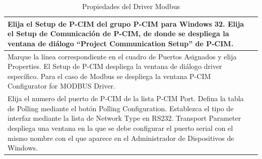 \begin{table}[H]
\centering
\renewcommand*{\arraystretch}{0.01}
\begin{tabular}{*{2}{m{}}}
\hline
  Elija el Setup de P-CIM del grupo P-CIM para Windows 32.
  Elija el Setup de Comunicación de P-CIM, de donde se despliega la ventana 
  de diálogo “Project Communication Setup” de P-CIM.
  &\begin{center}
    \rule{0.4\textwidth}{0.3\textwidth}
  \end{center}\\
\hline
  Marque la línea correspondiente en el cuadro de Puertos Asignados y elija 
  Properties. El Setup de P-CIM despliega la ventana de diálogo driver 
  específico. Para el caso de Modbus se despliega la ventana P-CIM Configurator 
  for MODBUS Driver.
  &\begin{center}
    \rule{0.4\textwidth}{0.3\textwidth}
  \end{center}\\
\hline
   Elija el numero del puerto de P-CIM de la lista P-CIM Port. Defina la tabla 
   de Polling mediante el botón Polling Configuration. Establezca el tipo de 
   interfaz mediante la lista de Network Type en RS232. Transport Parameter 
   despliega una ventana en la que se debe configurar el puerto serial con  el 
   mismo nombre con el que aparece en el Administrador de Dispositivos de 
   Windows.
  &\begin{center}
    \rule{0.4\textwidth}{0.3\textwidth}
  \end{center}\\
\hline
\end{tabular}
\label{tab:PropModbus}
\caption{Propiedades del Driver Modbus}
\end{table}


